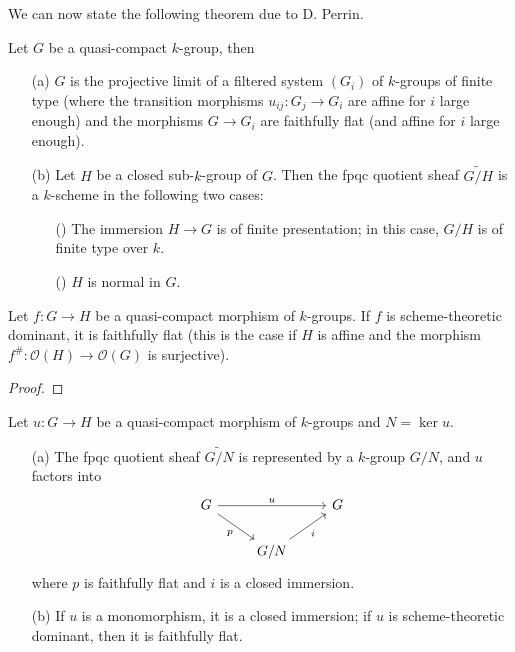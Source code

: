 We can now state the following theorem due to D. Perrin.
\begin{theorem}\label{scheme k-group qc is projective limit and quotient}
Let $G$ be a quasi-compact $k$-group, then
\begin{enumerate}
    \item[(a)] $G$ is the projective limit of a filtered system $(G_i)$ of $k$-groups of finite type (where the transition morphisms $u_{ij}:G_j\to G_i$ are affine for $i$ large enough) and the morphisms $G\to G_i$ are faithfully flat (and affine for $i$ large enough).
    \item[(b)] Let $H$ be a closed sub-$k$-group of $G$. Then the fpqc quotient sheaf $\widetilde{G/H}$ is a $k$-scheme in the following two cases:
    \begin{enumerate}
        \item[(\rmnum{1})] The immersion $H\to G$ is of finite presentation; in this case, $G/H$ is of finite type over $k$.
        \item[(\rmnum{2})] $H$ is normal in $G$.
    \end{enumerate}
\end{enumerate}
\end{theorem}

\begin{corollary}\label{scheme k-group morphism qc scheme dominant is faithfully flat}
Let $f:G\to H$ be a quasi-compact morphism of $k$-groups. If $f$ is scheme-theoretic dominant, it is faithfully flat (this is the case if $H$ is affine and the morphism $f^\#:\mathscr{O}(H)\to\mathscr{O}(G)$ is surjective). 
\end{corollary}
\begin{proof}

\end{proof}

\begin{corollary}\label{scheme k-group morphism qc quotient representable}
Let $u:G\to H$ be a quasi-compact morphism of $k$-groups and $N=\ker u$.
\begin{enumerate}
    \item[(a)] The fpqc quotient sheaf $\widetilde{G/N}$ is represented by a $k$-group $G/N$, and $u$ factors into
    \[\begin{tikzcd}
    G\ar[rr,"u"]\ar[rd,swap,"p"]&&G\\
    &G/N\ar[ru,swap,"i"]
    \end{tikzcd}\]
    where $p$ is faithfully flat and $i$ is a closed immersion.
    \item[(b)] If $u$ is a monomorphism, it is a closed immersion; if $u$ is scheme-theoretic dominant, then it is faithfully flat.
\end{enumerate}
\end{corollary}

